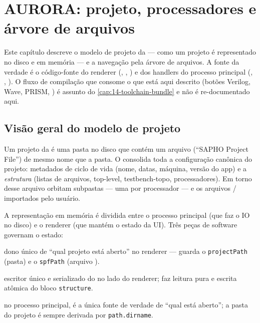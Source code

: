 \chapter{AURORA: projeto, processadores e árvore de arquivos}
\label{cap:07-aurora-projeto-arvore}

Este capítulo descreve o modelo de projeto da  — como um projeto
é representado no disco e em memória — e a navegação pela árvore de arquivos.
A fonte da verdade é o código-fonte do renderer (,
, ) e dos handlers do processo principal
(, , ).
O fluxo de compilação que consome o que está aqui descrito (botões Verilog,
Wave, PRISM, \cmm) é assunto do \autoref{cap:14-toolchain-bundle} e não é
re-documentado aqui.

\section{Visão geral do modelo de projeto}

Um projeto da  é uma pasta no disco que contém um arquivo
 (\enquote{SAPHO Project File}) de mesmo nome que a pasta. O
 consolida toda a configuração canônica do projeto: metadados de
ciclo de vida (nome, datas, máquina, versão do app) e a \emph{estrutura}
(listas de arquivos, top-level, testbench-topo, processadores). Em torno desse
arquivo orbitam subpastas — uma por processador  — e os arquivos
/ importados pelo usuário.

A representação em memória é dividida entre o processo principal (que faz o IO
no disco) e o renderer (que mantém o estado da UI). Três peças de software
governam o estado:

\begin{description}[leftmargin=2.2em,style=nextline]
  \item[\file{ProjectStore} (\path{js/project/project_store.js})] dono único de
    \enquote{qual projeto está aberto} no renderer — guarda o
    \lstinline|projectPath| (pasta) e o \lstinline|spfPath| (arquivo ).
  \item[\file{SpfStore} (\path{js/project/spf_store.ts})] escritor único e
    serializado do  no lado do renderer; faz leitura pura e escrita
    atômica do bloco \lstinline|structure|.
  \item[\file{state.currentOpenProjectPath} (\path{main/state.js})] no processo
    principal, é a única fonte de verdade de \enquote{qual  está
    aberto}; a pasta do projeto é sempre derivada por \lstinline|path.dirname|.
\end{description}

